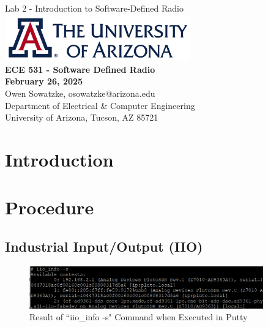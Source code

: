 \documentclass{article}
\begin{document}
\begin{titlepage}
	\centering
	{\huge Lab 2 - Introduction to Software-Defined Radio}\\[0.25 in]
	\includegraphics[width=0.6\textwidth]{ua_logo.png}\\[0.25 in]
	{\large \textbf{ECE 531 - Software Defined Radio\\[0.25 in]
	February 26, 2025\\[0.25 in]}}
	{\large Owen Sowatzke, osowatzke@arizona.edu\\[0.05 in]
	Department of Electrical \& Computer Engineering\\[0.05 in]
	University of Arizona, Tucson, AZ 85721\\[0.5 in]}
	\hypersetup{linkcolor=navy-blue}
	\noindent\hrulefill
	\tableofcontents
	\noindent\hrulefill
\end{titlepage}

\setlength{\parindent}{0pt}

\section{Introduction}

\section{Procedure}

\subsection{Industrial Input/Output (IIO)}
\label{subsection::industrial_input_output}

\begin{figure}[H]
	\centerline{\includegraphics[width=0.9\textwidth]{iio_info_putty.png}}
	\caption{Result of ``iio\_info -s" Command when Executed in Putty}
	\label{fig::iio_info_putty}
\end{figure}
\end{document}
